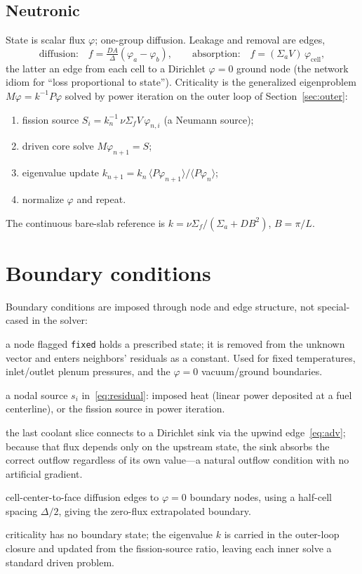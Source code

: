\documentclass[11pt]{article}
\begin{document}
\subsection{Neutronic}\label{sec:neut}
State is scalar flux $\varphi$; one-group diffusion. Leakage and removal are
edges,
\begin{equation}
\text{diffusion:}\quad f = \tfrac{D A}{\Delta}(\varphi_a-\varphi_b),\qquad
\text{absorption:}\quad f = (\Sigma_a V)\,\varphi_\text{cell},
\end{equation}
the latter an edge from each cell to a Dirichlet $\varphi{=}0$ ground node (the
network idiom for ``loss proportional to state''). Criticality is the
generalized eigenproblem $M\varphi=k^{-1}P\varphi$ solved by power iteration on
the outer loop of Section~\ref{sec:outer}:
\begin{enumerate}\setlength\itemsep{1pt}
\item fission source $S_i = k_n^{-1}\,\nu\Sigma_f V\,\varphi_{n,i}$ (a Neumann source);
\item driven core solve $M\varphi_{n+1}=S$;
\item eigenvalue update $k_{n+1}=k_n\,\langle P\varphi_{n+1}\rangle/\langle P\varphi_n\rangle$;
\item normalize $\varphi$ and repeat.
\end{enumerate}
The continuous bare-slab reference is $k = \nu\Sigma_f/(\Sigma_a + D B^2)$,
$B=\pi/L$.

\section{Boundary conditions}\label{sec:bc}
Boundary conditions are imposed through node and edge structure, not special-cased
in the solver:
\begin{description}\setlength\itemsep{2pt}
\item[Dirichlet] a node flagged \texttt{fixed} holds a prescribed state; it is
removed from the unknown vector and enters neighbors' residuals as a constant.
Used for fixed temperatures, inlet/outlet plenum pressures, and the
$\varphi{=}0$ vacuum/ground boundaries.
\item[Neumann] a nodal source $s_i$ in~\eqref{eq:residual}: imposed heat (linear
power deposited at a fuel centerline), or the fission source in power iteration.
\item[Advective outflow] the last coolant slice connects to a Dirichlet sink via
the upwind edge~\eqref{eq:adv}; because that flux depends only on the upstream
state, the sink absorbs the correct outflow regardless of its own value---a
natural outflow condition with no artificial gradient.
\item[Vacuum (neutron)] cell-center-to-face diffusion edges to $\varphi{=}0$
boundary nodes, using a half-cell spacing $\Delta/2$, giving the zero-flux
extrapolated boundary.
\item[Eigenvalue closure] criticality has no boundary state; the eigenvalue
$k$ is carried in the outer-loop closure and updated from the fission-source
ratio, leaving each inner solve a standard driven problem.
\end{description}
\end{document}
